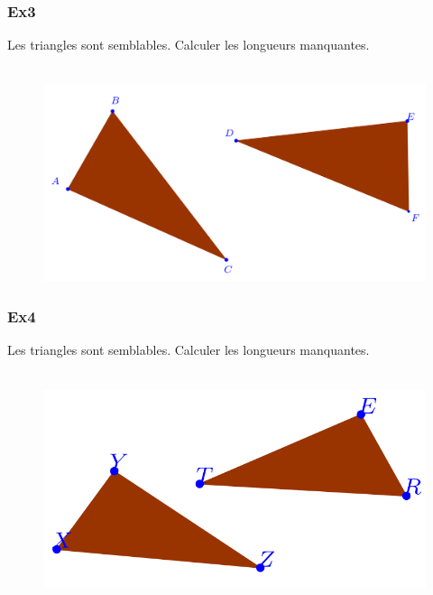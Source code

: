 \documentclass[11pt]{article}
\begin{document}
\begin{multicols}{2}
\subsubsection*{Ex3}

Les triangles sont semblables. Calculer les longueurs manquantes.

\begin{figure}[H]
      \centering
      \includegraphics[width=0.9\linewidth]{3x2-triangles-semblables/ex1.png}
\end{figure}


\subsubsection*{Ex4}

Les triangles sont semblables. Calculer les longueurs manquantes.

\begin{figure}[H]
      \centering
      \includegraphics[width=\linewidth]{3x2-triangles-semblables/ex3.png}
\end{figure}

\end{multicols}
\end{document}
